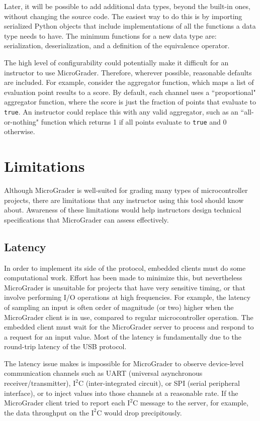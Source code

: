 \documentclass[12pt]{article}
\begin{document}
Later, it will be possible to add additional data types, beyond the built-in ones, without changing the source code.  The easiest way to do this is by importing serialized \cite{pickle} Python objects that include implementations of all the functions a data type needs to have.  The minimum functions for a new data type are: serialization, deserialization, and a definition of the equivalence operator.

The high level of configurability could potentially make it difficult for an instructor to use MicroGrader.  Therefore, wherever possible, reasonable defaults are included.  For example, consider the aggregator function, which maps a list of evaluation point results to a score.  By default, each channel uses a ``proportional" aggregator function, where the score is just the fraction of points that evaluate to \texttt{true}.  An instructor could replace this with any valid aggregator, such as an ``all-or-nothing" function which returns 1 if all points evaluate to \texttt{true} and 0 otherwise.


\newpage
\section{Limitations}
Although MicroGrader is well-suited for grading many types of microcontroller projects, there are limitations that any instructor using this tool should know about.  Awareness of these limitations would help instructors design technical specifications that MicroGrader can assess effectively.

\subsection{Latency}
In order to implement its side of the protocol, embedded clients must do some computational work.  Effort has been made to minimize this, but nevertheless MicroGrader is unsuitable for projects that have very sensitive timing, or that involve performing I/O operations at high frequencies.  For example, the latency of sampling an input is often order of magnitude (or two) higher when the MicroGrader client is in use, compared to regular microcontroller operation.  The embedded client must wait for the MicroGrader server to process and respond to a request for an input value.  Most of the latency is fundamentally due to the round-trip latency of the USB protocol.

The latency issue makes is impossible for MicroGrader to observe device-level communication channels such as UART (universal asynchronous receiver/transmitter), $\text{I}^2\text{C}$ (inter-integrated circuit), or SPI (serial peripheral interface), or to inject values into those channels at a reasonable rate.  If the MicroGrader client tried to report each $\text{I}^2\text{C}$ message to the server, for example, the data throughput on the $\text{I}^2\text{C}$ would drop precipitously.
\end{document}

